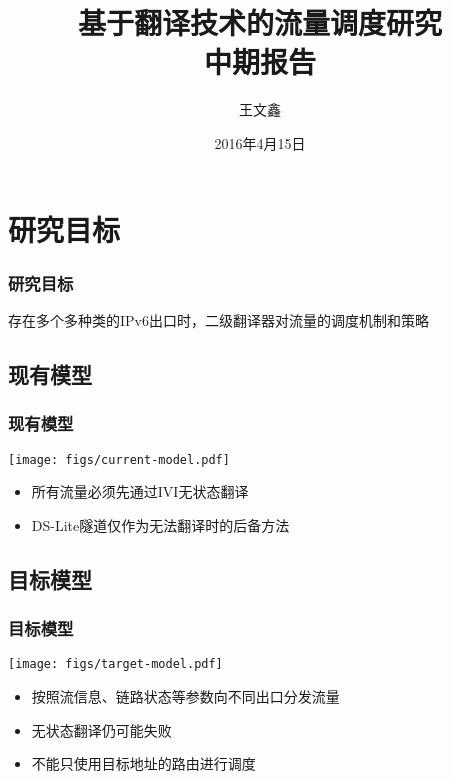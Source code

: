 \documentclass{beamer}
\title{
基于翻译技术的流量调度研究 \\
中期报告
}
\author{王文鑫}
\date{2016年4月15日}
\begin{document}
\begin{frame}
  \titlepage
\end{frame}

\section{研究目标}

\begin{frame}
  \frametitle{研究目标}

  存在多个多种类的IPv6出口时，二级翻译器对流量的调度机制和策略
\end{frame}

\subsection{现有模型}
\begin{frame}
  \frametitle{现有模型}

  \begin{center}
    \texttt{[image: figs/current-model.pdf]}  
  \end{center}

  \vspace{1em}

  \begin{block}{}
    \begin{itemize}
    \item 所有流量必须先通过IVI无状态翻译
    \item DS-Lite隧道仅作为无法翻译时的后备方法
    \end{itemize}
  \end{block}
\end{frame}

\subsection{目标模型}
\begin{frame}
  \frametitle{目标模型}

  \begin{center}
    \texttt{[image: figs/target-model.pdf]}  
  \end{center}

  \begin{block}{}
    \begin{itemize}
    \item 按照流信息、链路状态等参数向不同出口分发流量
    \item 无状态翻译仍可能失败
    \item 不能只使用目标地址的路由进行调度
    \end{itemize}
  \end{block}
\end{frame}
\end{document}
